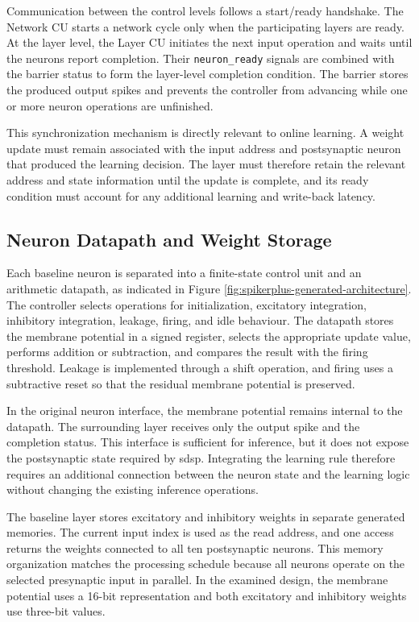 Communication between the control levels follows a start/ready handshake. The Network CU starts a network cycle only when the participating layers are ready. At the layer level, the Layer CU initiates the next input operation and waits until the neurons report completion. Their \texttt{neuron\_ready} signals are combined with the barrier status to form the layer-level completion condition. The barrier stores the produced output spikes and prevents the controller from advancing while one or more neuron operations are unfinished.

This synchronization mechanism is directly relevant to online learning. A weight update must remain associated with the input address and postsynaptic neuron that produced the learning decision. The layer must therefore retain the relevant address and state information until the update is complete, and its ready condition must account for any additional learning and write-back latency.

\subsection{Neuron Datapath and Weight Storage}

Each baseline neuron is separated into a finite-state control unit and an arithmetic datapath, as indicated in Figure \ref{fig:spikerplus-generated-architecture}. The controller selects operations for initialization, excitatory integration, inhibitory integration, leakage, firing, and idle behaviour. The datapath stores the membrane potential in a signed register, selects the appropriate update value, performs addition or subtraction, and compares the result with the firing threshold. Leakage is implemented through a shift operation, and firing uses a subtractive reset so that the residual membrane potential is preserved.

In the original neuron interface, the membrane potential remains internal to the datapath. The surrounding layer receives only the output spike and the completion status. This interface is sufficient for inference, but it does not expose the postsynaptic state required by \gls{sdsp}. Integrating the learning rule therefore requires an additional connection between the neuron state and the learning logic without changing the existing inference operations.

The baseline layer stores excitatory and inhibitory weights in separate generated memories. The current input index is used as the read address, and one access returns the weights connected to all ten postsynaptic neurons. This memory organization matches the processing schedule because all neurons operate on the selected presynaptic input in parallel. In the examined design, the membrane potential uses a 16-bit representation and both excitatory and inhibitory weights use three-bit values.

